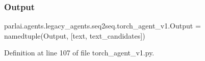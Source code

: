 \subsubsection{\texorpdfstring{Output}{Output}}
{\footnotesize\ttfamily parlai.\+agents.\+legacy\+\_\+agents.\+seq2seq.\+torch\+\_\+agent\+\_\+v1.\+Output = namedtuple(\textquotesingle{}Output\textquotesingle{}, \mbox{[}\textquotesingle{}text\textquotesingle{}, \textquotesingle{}text\+\_\+candidates\textquotesingle{}\mbox{]})}



Definition at line 107 of file torch\+\_\+agent\+\_\+v1.\+py.

